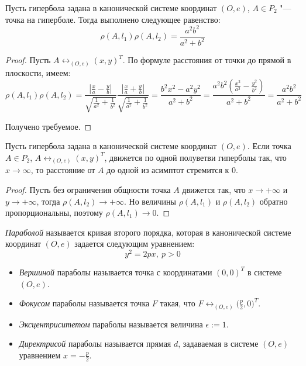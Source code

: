 \begin{proposition}
	Пусть гипербола задана в канонической системе координат $(O, e)$, $A \in P_2$ "--- точка на гиперболе. Тогда выполнено следующее равенство:
	\[\rho(A, l_1)\rho(A, l_2) = \frac{a^2b^2}{a^2 + b^2}\]
\end{proposition}

\begin{proof}
	Пусть $A \leftrightarrow_{(O, e)} (x, y)^T$. По формуле расстояния от точки до прямой в плоскости, имеем:
	\[\rho(A, l_1)\rho(A, l_2) = \frac{\left|\frac{x}{a}-\frac{y}{b}\right|}{\sqrt{\frac{1}{a^2} + \frac{1}{b^2}}} 
	\frac{\left|\frac{x}{a}+\frac{y}{b}\right|}{\sqrt{\frac{1}{a^2} + \frac{1}{b^2}}}
	= \frac{b^2x^2 - a^2y^2}{a^2 + b^2} = \frac{a^2b^2\left(\frac{x^2}{a^2} - \frac{y^2}{b^2}\right)}{a^2 + b^2} = \frac{a^2b^2}{a^2 + b^2}\]
	
	Получено требуемое.
\end{proof}

\begin{corollary}
	Пусть гипербола задана в канонической системе координат $(O, e)$. Если точка $A \in P_2$, $A \leftrightarrow_{(O, e)} (x, y)^T$, движется по одной полуветви гиперболы так, что $x \rightarrow \infty$, то расстояние от $A$ до одной из асимптот стремится к $0$.
\end{corollary}

\begin{proof}
	Пусть без ограничения общности точка $A$ движется так, что $x \rightarrow +\infty$ и $y \rightarrow +\infty$, тогда $\rho(A, l_2) \rightarrow +\infty$. Но величины $\rho(A, l_1)$ и $\rho(A, l_2)$ обратно пропорциональны, поэтому $\rho(A, l_1) \rightarrow 0$.
\end{proof}

\begin{definition}
	\textit{Параболой} называется кривая второго порядка, которая в канонической системе координат $(O, e)$ задается следующим уравнением:
	\[y^2 = 2px,~p > 0\]
	
	\begin{itemize}
		\item \textit{Вершиной} параболы называется точка с координатами $(0, 0)^T$ в системе $(O, e)$.
		
		\item \textit{Фокусом} параболы называется точка $F$ такая, что $F \leftrightarrow_{(O, e)} \big(\frac p2, 0\big)^T$.
		
		\item \textit{Эксцентриситетом} параболы называется величина $\epsilon := 1$.
		
		\item \textit{Директрисой} параболы называется прямая $d$, задаваемая в системе $(O, e)$ уравнением $x = -\frac{p}{2}$.
	\end{itemize}
\end{definition}

